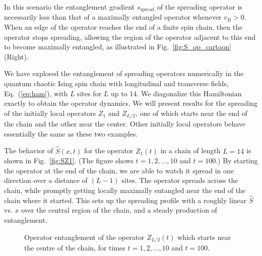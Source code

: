 \documentclass[aps,prx,twocolumn,superscriptaddress,floatfix,nofootinbib,prx]{revtex4}
\renewcommand{\>}{\right\rangle}
\newcommand{\<}{\left\langle}
\newcommand{\sspr}{s_\text{spread}}
\begin{document}
In this scenario the entanglement gradient $\sspr$ of the spreading operator is necessarily less than that of a maximally entangled operator whenever $v_B>0$.  When an edge of the operator reaches the end of a finite spin chain, then the operator stops spreading, 
allowing the region of the operator adjacent to this end to become maximally entangled, as illustrated in Fig.~\ref{fig:S_op_cartoon} (Right).

We have  explored the entanglement of spreading operators numerically in the quantum chaotic Ising spin chain with longitudinal and transverse fields, Eq.~(\ref{eq:ham}), with $L$ sites for $L$ up to 14. We  diagonalize this Hamiltonian exactly to obtain the operator dynamics.  We will present results for the spreading of the initially local operators $Z_1$ and $Z_{L/2}$, one of which starts near the end of the chain and the other near the center. Other initially local operators behave essentially the same as these two examples.

The behavior of $\hat S(x,t)$ for the operator $Z_1(t)$ in a chain of length $L=14$ is shown in  Fig.~\ref{fig:SZ1}. (The figure shows $t=1,2,\ldots, 10$ and $t=100$.) By starting the operator at the end of the chain, we are able to watch it spread in one direction over a distance of $(L-1)$ sites.  The operator spreads across the chain, while promptly getting locally maximally entangled near the end of the chain where it started.  This sets up the spreading profile with a roughly linear $\hat S$ vs. $x$ over the central region of the chain, and a steady production of entanglement. 

\begin{figure}[t]
\caption{
Operator entanglement of the operator $Z_{L/2}(t)$ which starts near the centre of the chain, for times ${t=1,2,\ldots,10}$ and $t=100$.} 
 \label{fig:SZmid}
\end{figure}
\end{document}
